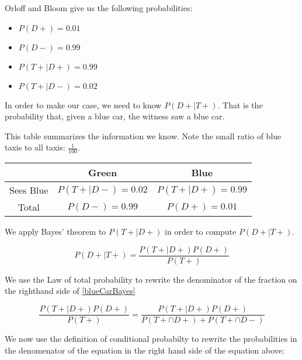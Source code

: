 \documentclass[a4paper,11pt]{article}
\begin{document}
Orloff and Bloom give us the following probabilities:

\begin{itemize}
  \item $P \left( D+ \right) = 0.01$
  \item $P \left( D- \right) = 0.99$
  \item $P \left( T+ \mid D+ \right) = 0.99$
  \item $P \left( T+ \mid D- \right) = 0.02$
\end{itemize}

In order to make our case, we need to know 
$P \left( D+ \mid T+ \right)$. That is the probability that, given a 
blue car, the witness saw a blue car.  

This table summarizes the information we know.  Note the small 
ratio of blue taxis to all taxis: $\frac{1}{100}$.

\begin{center}
  \begin{tabular}{ | c | c | c |  }
    \hline
         & Green & Blue     \\ \hline
    Sees Blue & $P\left(T+ \mid D- \right) = 0.02$ & $P \left( T+ \mid D+ \right)=0.99$   \\ \hline
    Total & $P \left( D- \right) = 0.99$ &  $P \left( D+ \right) = 0.01$   \\ \hline
  \end{tabular}
\end{center}

We apply Bayes' theorem \cite{reading3} to $P \left(T+ \mid D+ \right)$
in order to compute $P \left( D+ \mid T+ \right)$.

\begin{equation} \label{blueCarBayes}
P \left( D+ \mid T+ \right)
  = \frac{ P \left( T+ \mid D+ \right) P \left( D+ \right) }
    { P \left( T+ \right) }
\end{equation}

We use the Law of total probability to rewrite the denominator of the
fraction on the righthand side of \ref{blueCarBayes}

\begin{equation}
\frac{ P \left( T+ \mid D+ \right) P \left( D+ \right) }
    { P \left( T+ \right) }
  = 
\frac{ P \left( T+ \mid D+ \right) P \left( D+ \right) }
    { P \left( T+ \cap D+ \right) + P \left( T+ \cap D- \right) }
\end{equation}

We now use the definition of conditional probabilty to rewrite the
probabilities in the denomenator of the equation in the right hand side
of the equation above:
\end{document}
